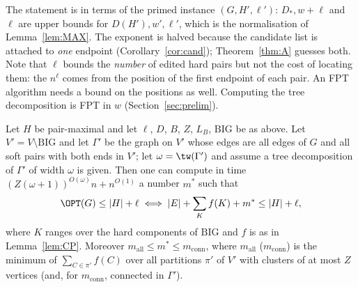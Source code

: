 \begin{remark}\label{rem:primed}
The statement is in terms of the primed instance $(G,H',\ell')$: $D_*,w+\ell$ and $\ell$ are upper bounds for $D(H'),w',\ell'$, which is the normalisation of Lemma~\ref{lem:MAX}. The exponent is halved because the candidate list is attached to \emph{one} endpoint (Corollary~\ref{cor:cand}); Theorem~\ref{thm:A} guesses both. Note that $\ell$ bounds the \emph{number} of edited hard pairs but not the cost of locating them: the $n^{\ell}$ comes from the position of the first endpoint of each pair. An FPT algorithm needs a bound on the positions as well. Computing the tree decomposition is FPT in $w$ (Section~\ref{sec:prelim}).
\end{remark}

\begin{theorem}\label{thm:omega}
Let $H$ be pair-maximal and let $\ell$, $D$, $B$, $Z$, $L_B$, $\mathrm{BIG}$ be as above. Let $V'=V\setminus\mathrm{BIG}$ and let $\Gamma'$ be the graph on $V'$ whose edges are all edges of $G$ and all soft pairs with both ends in $V'$; let $\omega=\tw(\Gamma')$ and assume a tree decomposition of $\Gamma'$ of width $\omega$ is given. Then one can compute in time $(Z(\omega+1))^{O(\omega)}n+n^{O(1)}$ a number $m^*$ such that
\[
\OPT(G)\le|H|+\ell\iff|E|+\sum_{K}f(K)+m^*\le|H|+\ell ,
\]
where $K$ ranges over the hard components of $\mathrm{BIG}$ and $f$ is as in Lemma~\ref{lem:CP}. Moreover $m_{\mathrm{all}}\le m^*\le m_{\mathrm{conn}}$, where $m_{\mathrm{all}}$ ($m_{\mathrm{conn}}$) is the minimum of $\sum_{C\in\pi'}f(C)$ over all partitions $\pi'$ of $V'$ with clusters of at most $Z$ vertices (and, for $m_{\mathrm{conn}}$, connected in $\Gamma'$).
\end{theorem}
